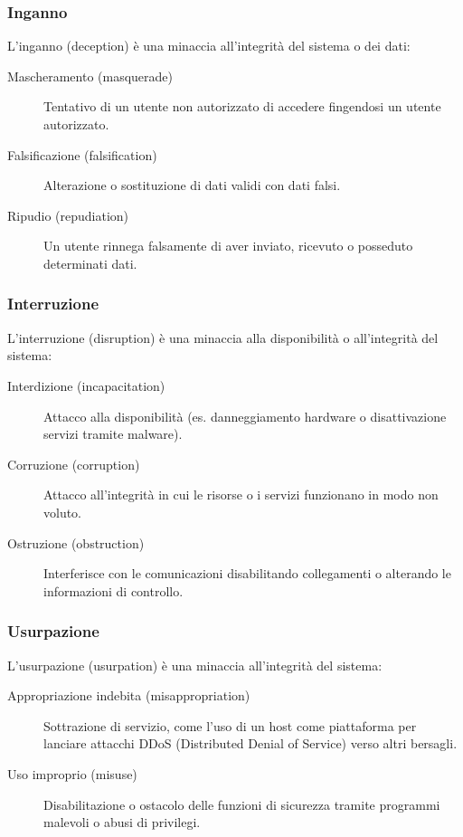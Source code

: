 \subsubsection{Inganno}
L'inganno (deception) è una minaccia all'integrità del sistema o dei dati:
\begin{description}
    \item[Mascheramento (masquerade)] Tentativo di un utente non autorizzato di accedere fingendosi un utente autorizzato.
    \item[Falsificazione (falsification)] Alterazione o sostituzione di dati validi con dati falsi.
    \item[Ripudio (repudiation)] Un utente rinnega falsamente di aver inviato, ricevuto o posseduto determinati dati.
\end{description}

\subsubsection{Interruzione}
L'interruzione (disruption) è una minaccia alla disponibilità o all'integrità del sistema:
\begin{description}
    \item[Interdizione (incapacitation)] Attacco alla disponibilità (es. danneggiamento hardware o disattivazione servizi tramite malware).
    \item[Corruzione (corruption)] Attacco all'integrità in cui le risorse o i servizi funzionano in modo non voluto.
    \item[Ostruzione (obstruction)] Interferisce con le comunicazioni disabilitando collegamenti o alterando le informazioni di controllo.
\end{description}

\subsubsection{Usurpazione}
L'usurpazione (usurpation) è una minaccia all'integrità del sistema:
\begin{description}
    \item[Appropriazione indebita (misappropriation)] Sottrazione di servizio, come l'uso di un host come piattaforma per lanciare attacchi DDoS (Distributed Denial of Service) verso altri bersagli.
    \item[Uso improprio (misuse)] Disabilitazione o ostacolo delle funzioni di sicurezza tramite programmi malevoli o abusi di privilegi.
\end{description}

